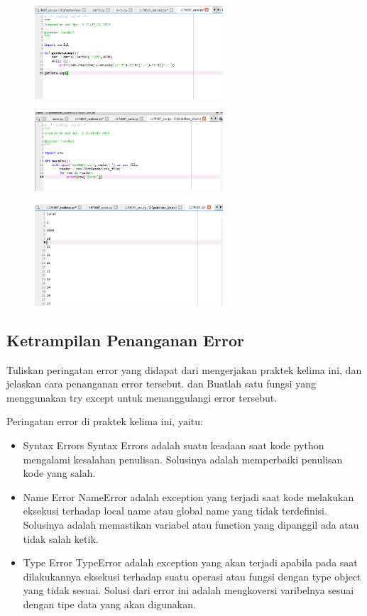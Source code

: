 \begin{figure}[ht]
	\includegraphics[width=7cm]{figures/5/1174087/Praktek/1174087_save1.png}
	\centering
\end{figure}

\begin{figure}[ht]
	\includegraphics[width=7cm]{figures/5/1174087/Praktek/1174087_csv.png}
	\centering
\end{figure}

\begin{figure}[ht]
	\includegraphics[width=7cm]{figures/5/1174087/Praktek/1174087csv.png}
	\centering
\end{figure}


\subsection{Ketrampilan Penanganan Error}
Tuliskan  peringatan  error  yang  didapat  dari  mengerjakan  praktek  kelima  ini, dan  jelaskan  cara  penanganan  error  tersebut.   dan  Buatlah  satu  fungsi  yang menggunakan try except untuk menanggulangi error tersebut.

Peringatan error di praktek kelima ini, yaitu:
\begin{itemize}
	\item Syntax Errors
	Syntax Errors adalah suatu keadaan saat kode python mengalami kesalahan penulisan. Solusinya adalah memperbaiki penulisan kode yang salah.

	\item Name Error
	NameError adalah exception yang terjadi saat kode melakukan eksekusi terhadap local name atau global name yang tidak terdefinisi. Solusinya adalah memastikan variabel atau function yang dipanggil ada atau tidak salah ketik.

	\item Type Error
	TypeError adalah exception yang akan terjadi apabila pada saat dilakukannya eksekusi terhadap suatu operasi atau fungsi dengan type object yang tidak sesuai. Solusi dari error ini adalah mengkoversi varibelnya sesuai dengan tipe data yang akan digunakan.
\end{itemize}

